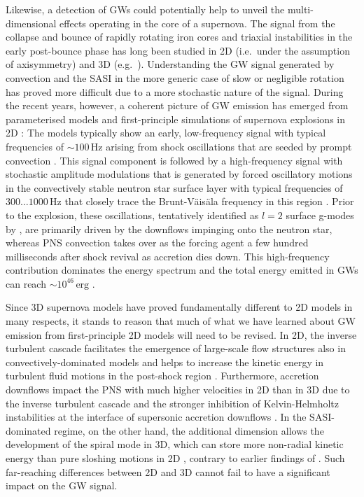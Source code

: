 Likewise, a detection of GWs could potentially help to
unveil the multi-dimensional effects operating in the core of a
supernova. The signal from the collapse and bounce of rapidly rotating
iron cores and triaxial instabilities in the early post-bounce phase
has long been studied in 2D (i.e.\ under the assumption of
axisymmetry) and 3D
(e.g.\ \citealp{ott_06_a,dimmelmeier_07_a,dimmelmeier_08,scheidegger_08,abdikamalov_10}). Understanding
the GW signal generated by convection and the SASI in
the more generic case of slow or negligible rotation has proved more
difficult due to a more stochastic nature of the signal. During the
recent years, however, a coherent picture of GW
emission has emerged from parameterised models \citep{murphy_09} and
first-principle simulations of supernova explosions in 2D
\citep{marek_08,mueller_13}: The models typically show an early,
low-frequency signal with typical frequencies of $\mathord{\sim} 100
\,\mathrm{Hz}$ arising from shock oscillations that are seeded by
prompt convection
\citep{marek_08,murphy_09,yakunin_10,mueller_13,yakunin_15}. This
signal component is followed by a high-frequency signal with stochastic
amplitude modulations that is generated by forced oscillatory motions
in the convectively stable neutron star surface layer
\citep{marek_08,murphy_09,mueller_13} with typical frequencies of $300
\ldots 1000 \,\mathrm{Hz}$  that closely trace the
Brunt-V\"ais\"ala frequency in this region \citep{mueller_13}. Prior
to the explosion, these oscillations, tentatively identified as $l=2$
surface g-modes by \citet{mueller_13}, are primarily driven by the
downflows impinging onto the neutron star, whereas PNS
convection takes over as the forcing agent a few hundred
milliseconds after shock revival as accretion dies down.  This
high-frequency contribution dominates the energy spectrum and the
total energy emitted in GWs can reach
$\mathord{\sim} 10^{46} \,\mathrm{erg}$ \citep{mueller_13,yakunin_15}.

Since 3D supernova models have proved fundamentally different to 2D
models in many respects, it stands to reason that much of what we have
learned about GW emission from first-principle 2D
models will need to be revised. In 2D, the inverse turbulent cascade
\citep{kraichnan_76} facilitates the emergence of large-scale flow
structures also in convectively-dominated models and helps to increase
the kinetic energy in turbulent fluid motions in the post-shock region
\citep{hanke_12}. Furthermore, accretion downflows impact the
PNS with much higher velocities in 2D than in 3D \citep{melson_15a} due to the
inverse turbulent cascade and the stronger inhibition of
Kelvin-Helmholtz instabilities at the interface of supersonic
accretion downflows \citep{mueller_15b}. In the SASI-dominated regime,
on the other hand, the additional dimension allows the development of
the spiral mode \citep{blondin_07a,blondin_07b,fernandez_10} in 3D,
which can store more non-radial kinetic energy than pure sloshing
motions in 2D \citep{hanke_13,fernandez_15}, contrary to earlier
findings of \cite{iwakami_08}. Such far-reaching differences
between 2D and 3D cannot fail to have a significant impact on
the GW signal. 

